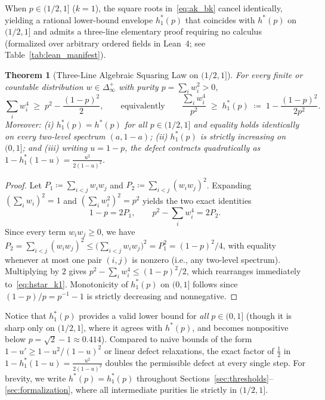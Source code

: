 \documentclass[11pt,a4paper]{article}
\newtheorem{theorem}{Theorem}[section]
\theoremstyle{definition}
\begin{document}
When $p \in (1/2, 1]$ ($k = 1$), the square roots in~\eqref{eq:ak_bk} cancel identically, yielding a rational lower-bound envelope $h_1^*(p)$ that coincides with $h^*(p)$ on $(1/2,1]$ and admits a three-line elementary proof requiring no calculus (formalized over arbitrary ordered fields in Lean~4; see Table~\ref{tab:lean_manifest}).

\begin{theorem}[Three-Line Algebraic Squaring Law on ${(1/2, 1]}$]
\label{thm:squaring_k1}
For every finite or countable distribution $w \in \Delta_\infty^+$ with purity $p = \sum_i w_i^2 > 0$,
\begin{equation}
  \sum_i w_i^4 \;\ge\; p^2 - \frac{(1 - p)^2}{2},
  \qquad\text{equivalently}\qquad
  \frac{\sum_i w_i^4}{p^2} \;\ge\; h_1^*(p) \;\coloneqq\; 1 - \frac{(1 - p)^2}{2 p^2}.
  \label{eq:hstar_k1}
\end{equation}
Moreover: (i) $h_1^*(p) = h^*(p)$ for all $p \in (1/2, 1]$ and equality holds identically on every two-level spectrum $(a, 1-a)$; (ii) $h_1^*(p)$ is strictly increasing on $(0, 1]$; and (iii) writing $u = 1 - p$, the defect contracts quadratically as $1 - h_1^*(1 - u) = \frac{u^2}{2(1-u)^2}$.
\end{theorem}

\begin{proof}
Let $P_1 \coloneqq \sum_{i < j} w_i w_j$ and $P_2 \coloneqq \sum_{i < j} (w_i w_j)^2$. Expanding $(\sum_i w_i)^2 = 1$ and $(\sum_i w_i^2)^2 = p^2$ yields the two exact identities
\[
  1 - p = 2 P_1, \qquad p^2 - \sum_i w_i^4 = 2 P_2.
\]
Since every term $w_i w_j \ge 0$, we have $P_2 = \sum_{i<j}(w_i w_j)^2 \le \bigl(\sum_{i<j} w_i w_j\bigr)^2 = P_1^2 = (1-p)^2/4$, with equality whenever at most one pair $(i,j)$ is nonzero (i.e., any two-level spectrum). Multiplying by $2$ gives $p^2 - \sum_i w_i^4 \le (1-p)^2/2$, which rearranges immediately to~\eqref{eq:hstar_k1}. Monotonicity of $h_1^*(p)$ on $(0,1]$ follows since $(1-p)/p = p^{-1}-1$ is strictly decreasing and nonnegative.
\end{proof}

Notice that $h_1^*(p)$ provides a valid lower bound for \emph{all} $p \in (0,1]$ (though it is sharp only on $(1/2, 1]$, where it agrees with $h^*(p)$, and becomes nonpositive below $p = \sqrt{2}-1 \approx 0.414$). Compared to naive bounds of the form $1 - u' \ge 1 - u^2/(1-u)^2$ or linear defect relaxations, the exact factor of $\frac{1}{2}$ in $1 - h_1^*(1-u) = \frac{u^2}{2(1-u)^2}$ doubles the permissible defect at every single step. For brevity, we write $h^*(p) = h_1^*(p)$ throughout Sections~\ref{sec:thresholds}--\ref{sec:formalization}, where all intermediate purities lie strictly in $(1/2, 1]$.
\end{document}
